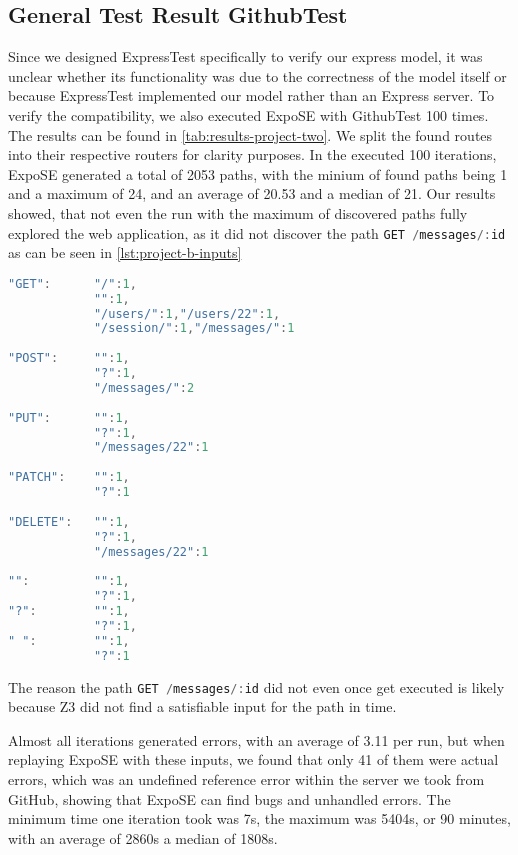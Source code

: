 \FloatBarrier
\subsection{General Test Result GithubTest}

Since we designed ExpressTest specifically to verify our express model, it was unclear whether its functionality was due to the correctness of the model itself or because ExpressTest implemented our model rather than an Express server. To verify the compatibility, we also executed ExpoSE with GithubTest 100 times.
The results can be found in \autoref{tab:results-project-two}.
We split the found routes into their respective routers for clarity purposes. 
In the executed 100 iterations, ExpoSE generated a total of 2053 paths, with the minium of found paths being 1 and a maximum of 24, and an average of 20.53 and a median of 21. 
Our results showed, that not even the run with the maximum of discovered paths fully explored the web application, as it did not discover the path
\lstinline[language=JavaScript]{GET /messages/:id} as can be seen in \autoref{lst:project-b-inputs}
\begin{lstlisting}[language=JavaScript, float, label={lst:project-b-inputs}, caption={[Generated Inputs for GithubTest]The inputs generated for GithubTest, listed by the HTTP method, grouped by the router.}]
"GET":      "/":1,
            "":1,
            "/users/":1,"/users/22":1,
            "/session/":1,"/messages/":1
            
"POST":     "":1,
            "?":1,
            "/messages/":2
            
"PUT":      "":1,
            "?":1,
            "/messages/22":1
            
"PATCH":    "":1,
            "?":1
            
"DELETE":   "":1,
            "?":1,
            "/messages/22":1
            
"":         "":1,
            "?":1,
"?":        "":1,
            "?":1,
" ":        "":1,
            "?":1
\end{lstlisting}

The reason the path \lstinline[language=JavaScript]{GET /messages/:id} 
did not even once get executed is likely because Z3 did not find a satisfiable input for the  path in time.

Almost all iterations generated errors, with an average of 3.11 per run, but when replaying ExpoSE with these inputs, we found that only 41 of them were actual errors, which was an undefined reference error within the server we took from GitHub, showing that ExpoSE can find bugs and unhandled errors.
The minimum time one iteration took was 7s, the maximum was 5404s, or 90 minutes, with an average of 2860s a median of 1808s.


